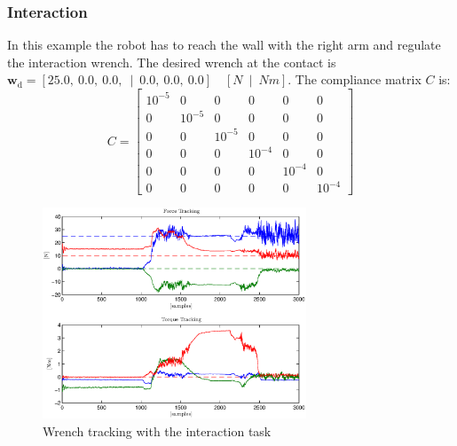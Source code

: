 \subsubsection{Interaction}
In this example the robot has to reach the wall with the right arm and regulate the interaction wrench. The desired wrench at the contact is $\mathbf{w}_\text{d} = \left[25.0, \ 0.0, \ 0.0, \ \mid \ 0.0, \ 0.0, \ 0.0 \right] \quad \left[N \ \mid \ Nm \right]$. The compliance matrix $C$ is:
\begin{equation}
C = \begin{bmatrix}
10^{-5} & 0 & 0 & 0 & 0 & 0\\ 
0 & 10^{-5} & 0 & 0 & 0 & 0\\ 
0 & 0 & 10^{-5} & 0 & 0 & 0\\ 
0 & 0 & 0 & 10^{-4} & 0 & 0\\ 
0 & 0 & 0 & 0 & 10^{-4} & 0\\ 
0 & 0 & 0 & 0 & 0 & 10^{-4}
\end{bmatrix}
\end{equation}
\begin{figure}[!h]
\vspace{2 mm}
\centering
\includegraphics[width=0.7\textwidth]{images/interaction/wrench_tracking.eps}
\caption{Wrench tracking with the interaction task}
\label{wrench_tracking}
\end{figure}

